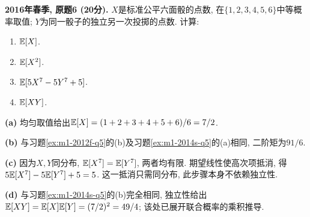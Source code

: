 \begin{exercise}\label{ex:m1-2016s-q6}
\textbf{2016年春季, 原题6 (20分).} $X$是标准公平六面骰的点数, 在$\{1,2,3,4,5,6\}$中等概率取值; $Y$为同一骰子的独立另一次投掷的点数. 计算:
\begin{enumerate}\item[(a)]\label{ex:m1-2016s-q6-a} $\mathbb E[X]$.\item[(b)]\label{ex:m1-2016s-q6-b} $\mathbb E[X^2]$.\item[(c)]\label{ex:m1-2016s-q6-c} $\mathbb E[5X^7-5Y^7+5]$.\item[(d)]\label{ex:m1-2016s-q6-d} $\mathbb E[XY]$.\end{enumerate}
\end{exercise}
\begin{solution}
\textbf{(a)}\label{sol:m1-2016s-q6-a} 均匀取值给出$\mathbb E[X]=(1+2+3+4+5+6)/6=7/2$.

\textbf{(b)}\label{sol:m1-2016s-q6-b} 与习题\ref{ex:m1-2012f-q5}的(b)及习题\ref{ex:m1-2014s-q5}的(a)相同, 二阶矩为$91/6$.

\textbf{(c)}\label{sol:m1-2016s-q6-c} 因为$X,Y$同分布, $\mathbb E[X^7]=\mathbb E[Y^7]$, 两者均有限. 期望线性使高次项抵消, 得$5\mathbb E[X^7]-5\mathbb E[Y^7]+5=5$. 这一抵消只需同分布, 此步骤本身不依赖独立性.

\textbf{(d)}\label{sol:m1-2016s-q6-d} 与习题\ref{ex:m1-2014s-q5}的(b)完全相同, 独立性给出$\mathbb E[XY]=\mathbb E[X]\mathbb E[Y]=(7/2)^2=49/4$; 该处已展开联合概率的乘积推导.
\end{solution}

